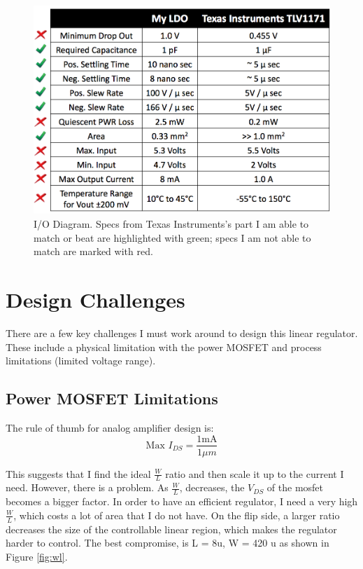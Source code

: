 \documentclass[10pt]{amsart}
\begin{document}
\begin{figure}[h]
	\begin{center}
		\includegraphics[width=6in]{Media/specs.png}
	\end{center}
	\caption{I/O Diagram. Specs from Texas Instruments's part I am able to match or beat are highlighted with green; specs I am not able to match are marked with red.}
	\label{fig:specs}
\end{figure}

\section{Design Challenges}

There are a few key challenges I must work around to design this linear regulator. These include a physical limitation with the power MOSFET and process limitations (limited voltage range).

\subsection{Power MOSFET Limitations}

The rule of thumb for analog amplifier design is:
\begin{equation}
\text{Max } I_{DS} = \frac{1 \text{mA}}{ 1 \mu m}
\end{equation}

This suggests that I find the ideal $\frac{W}{L}$ ratio and then scale it up to the current I need. However, there is a problem. As $\frac{W}{L}$, decreases, the $V_{DS}$ of the mosfet becomes a bigger factor. In order to have an efficient regulator, I need a very high $\frac{W}{L}$, which costs a lot of area that I do not have. On the flip side, a larger ratio decreases the size of the controllable linear region, which makes the regulator harder to control. The best compromise, is L = 8u, W = 420 u as shown in Figure \ref{fig:wl}.
\end{document}
